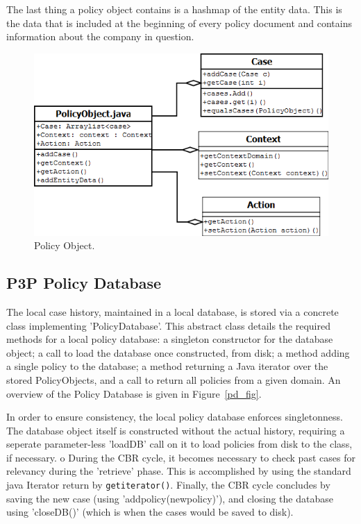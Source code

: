 The last thing a policy object contains is a hashmap of the entity data. This is the data that is included at the beginning of every policy document and contains information about the company in question.

\begin{figure}[htbp]
\begin{center}
\includegraphics[width = \textwidth]{DesignReport/uml/po.png}
\caption{Policy Object.}
\label{po_fig}
\end{center}
\end{figure}

\subsection{P3P Policy Database}
The local case history, maintained in a local database, is stored via a concrete class implementing 'PolicyDatabase'. This abstract class details the required methods for a local policy database: a singleton constructor for the database object; a call to load the database once constructed, from disk; a method adding a single policy to the database; a method returning a Java iterator over the stored PolicyObjects, and a call to return all policies from a given domain. An overview of the Policy Database is given in Figure~\ref{pd_fig}.

In order to ensure consistency, the local policy database enforces singletonness. The database object itself is constructed without the actual history, requiring a seperate parameter-less 'loadDB' call on it to load policies from disk to the class, if necessary.
o 
During the CBR cycle, it becomes necessary to check past cases for relevancy during the 'retrieve' phase. This is accomplished by using the standard java Iterator return by \texttt{getiterator()}.
Finally, the CBR cycle concludes by saving the new case (using 'addpolicy(newpolicy)'), and closing the database using 'closeDB()' (which is when the cases would be saved to disk).



